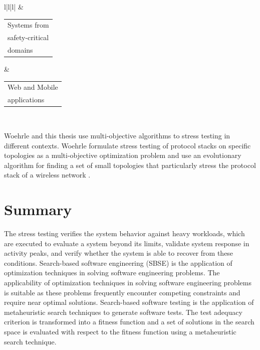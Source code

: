 \documentclass[espaco=umemeio,chapter=TITLE,twoside,openright]{abnt}
\begin{document}
\begin{table}[h]
\begin{tabular}{l|l|l|}
 & \begin{tabular}[c]{@{}l@{}}Systems from \\ safety-critical \\ domains\end{tabular}                                         & \begin{tabular}[c]{@{}l@{}}Web and Mobile \\ applications\end{tabular}                                                                 \\ \hline
\end{tabular}
\end{table}

Woehrle and this thesis use multi-objective algorithms to stress testing in different contexts. Woehrle formulate stress testing of protocol stacks on specific topologies as a multi-objective optimization problem and use an evolutionary algorithm for finding a set of small topologies that particularly stress the protocol stack of a wireless network \cite{Woehrle2012}. 


\section{Summary}

The stress testing verifies the system behavior against heavy workloads, which are executed to evaluate a system beyond its limits, validate system response in activity peaks, and verify whether the system is able to recover from these conditions. Search-based software engineering (SBSE) is the application of optimization techniques in solving software engineering problems. The applicability of optimization techniques in solving software engineering problems is suitable as these problems frequently encounter competing constraints and require near optimal solutions.  Search-based software testing is the application of metaheuristic search techniques to generate software tests. The test adequacy criterion is transformed into a fitness function and a set of solutions in the search space is evaluated with respect to the fitness function using a metaheuristic search technique.
\end{document}
